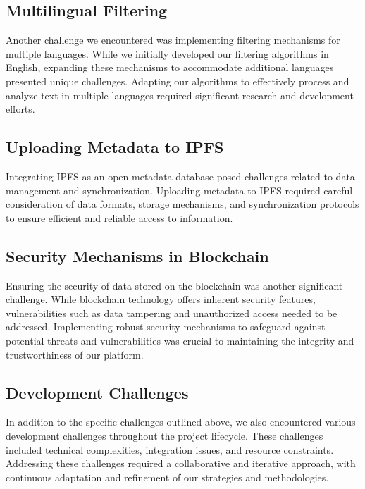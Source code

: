 \documentclass{article}
\begin{document}
\subsection{Multilingual Filtering}

Another challenge we encountered was implementing filtering mechanisms for multiple languages. While we initially developed our filtering algorithms in English, expanding these mechanisms to accommodate additional languages presented unique challenges. Adapting our algorithms to effectively process and analyze text in multiple languages required significant research and development efforts.

\subsection{Uploading Metadata to IPFS}

Integrating IPFS as an open metadata database posed challenges related to data management and synchronization. Uploading metadata to IPFS required careful consideration of data formats, storage mechanisms, and synchronization protocols to ensure efficient and reliable access to information.

\subsection{Security Mechanisms in Blockchain}

Ensuring the security of data stored on the blockchain was another significant challenge. While blockchain technology offers inherent security features, vulnerabilities such as data tampering and unauthorized access needed to be addressed. Implementing robust security mechanisms to safeguard against potential threats and vulnerabilities was crucial to maintaining the integrity and trustworthiness of our platform.

\subsection{Development Challenges}

In addition to the specific challenges outlined above, we also encountered various development challenges throughout the project lifecycle. These challenges included technical complexities, integration issues, and resource constraints. Addressing these challenges required a collaborative and iterative approach, with continuous adaptation and refinement of our strategies and methodologies.
\end{document}
